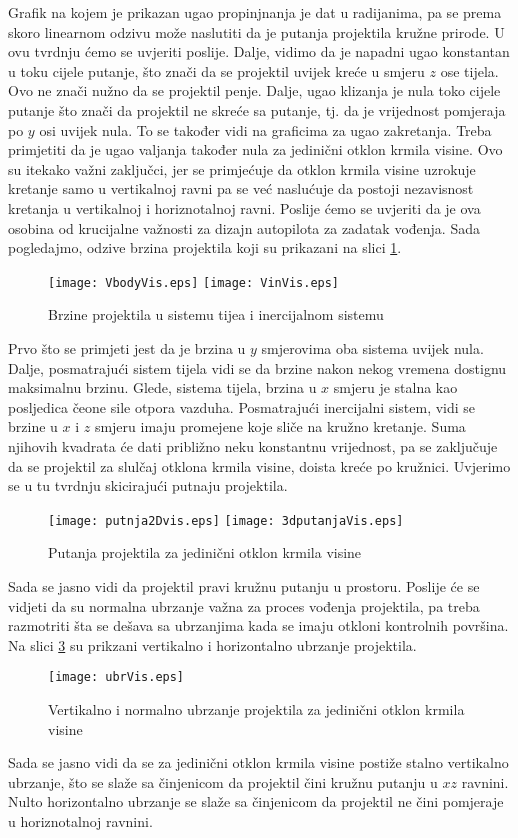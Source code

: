 Grafik na kojem je prikazan ugao propinjnanja je dat u radijanima, pa se prema skoro linearnom 
odzivu može naslutiti da je putanja projektila kružne prirode. U ovu tvrdnju ćemo se uvjeriti poslije. Dalje,
vidimo da je napadni ugao konstantan u toku cijele putanje, što znači da se projektil uvijek kreće u smjeru $z$ ose tijela.
Ovo ne znači nužno da se projektil penje. Dalje, ugao klizanja je nula toko cijele putanje što 
znači da projektil ne skreće sa putanje, tj. da je vrijednost pomjeraja po $y$ osi uvijek nula. To se također 
vidi na graficima za ugao zakretanja. Treba primjetiti da je ugao valjanja također nula za jedinični otklon 
krmila visine. Ovo su itekako važni zaključci, jer se primjećuje da otklon krmila visine uzrokuje 
kretanje samo u vertikalnoj ravni pa se već naslućuje da postoji nezavisnost kretanja u vertikalnoj i horiznotalnoj 
ravni. Poslije ćemo se uvjeriti da je ova osobina od krucijalne važnosti za dizajn autopilota za zadatak vođenja. 
Sada pogledajmo, odzive brzina projektila koji su prikazani na slici \ref{fig:brzine}.
\begin{figure}[!ht]
    \centering 
    \texttt{[image: VbodyVis.eps]}
    \texttt{[image: VinVis.eps]}
    \caption{Brzine projektila u sistemu tijea i inercijalnom sistemu}
    \label{fig:brzine}
\end{figure}
Prvo što se primjeti jest da je brzina u $y$ smjerovima oba sistema uvijek nula. Dalje, posmatrajući 
sistem tijela vidi se da brzine nakon nekog vremena dostignu maksimalnu brzinu. Glede,
sistema tijela, brzina u $x$ smjeru je stalna kao posljedica čeone sile otpora vazduha. Posmatrajući
inercijalni sistem, vidi se brzine u $x$ i $z$ smjeru imaju promejene koje sliče na kružno kretanje. Suma njihovih kvadrata 
će dati približno neku konstantnu vrijednost, pa se zaključuje da se projektil za slulčaj otklona krmila visine, 
doista kreće po kružnici. Uvjerimo se u tu tvrdnju skicirajući putnaju projektila. 
\begin{figure}[!ht]
    \centering 
    \texttt{[image: putnja2Dvis.eps]}
    \texttt{[image: 3dputanjaVis.eps]}
    \caption{Putanja projektila za jedinični otklon krmila visine}
    \label{fig:2dpath}
\end{figure}
Sada se jasno vidi da projektil pravi kružnu putanju u prostoru. 
Poslije će se vidjeti da su normalna ubrzanje važna za proces vođenja projektila, pa treba razmotriti 
šta se dešava sa ubrzanjima kada se imaju otkloni kontrolnih površina. Na slici \ref{fig:ubrVis} su 
prikzani vertikalno i horizontalno ubrzanje projektila.
\begin{figure}[!ht]
    \centering 
    \texttt{[image: ubrVis.eps]}
    \caption{Vertikalno i normalno ubrzanje projektila za jedinični otklon krmila visine}
    \label{fig:ubrVis}
\end{figure}
Sada se jasno vidi da se za jedinični otklon krmila visine postiže stalno vertikalno ubrzanje, što se slaže sa 
činjenicom da projektil čini kružnu putanju u $xz$ ravnini. Nulto horizontalno ubrzanje 
se slaže sa činjenicom da projektil ne čini pomjeraje u horiznotalnoj ravnini. 
